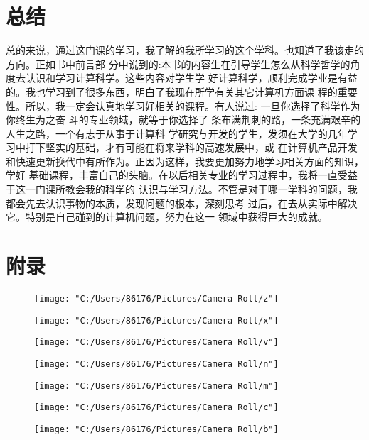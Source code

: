 \documentclass{article}
\begin{document}
\begin{itemize}
\end{itemize}


\section{总结}
总的来说，通过这门课的学习，我了解的我所学习的这个学科。也知道了我该走的方向。正如书中前言部 分中说到的:本书的内容生在引导学生怎么从科学哲学的角度去认识和学习计算科学。这些内容对学生学 好计算科学，顺利完成学业是有益的。我也学习到了很多东西，明白了我现在所学有关其它计算机方面课 程的重要性。所以，我一定会认真地学习好相关的课程。有人说过: 一旦你选择了科学作为你终生为之奋 斗的专业领域，就等于你选择了-条布满荆刺的路，一条充满艰辛的人生之路，一个有志于从事于计算科 学研究与开发的学生，发须在大学的几年学习中打下坚实的基础，才有可能在将来学科的高速发展中，或 在计算机产品开发和快速更新换代中有所作为。正因为这样，我要更加努力地学习相关方面的知识，学好 基础课程，丰富自己的头脑。在以后相关专业的学习过程中，我将一直受益于这一门课所教会我的科学的 认识与学习方法。不管是对于哪一学科的问题，我都会先去认识事物的本质，发现问题的根本，深刻思考 过后，在去从实际中解决它。特别是自己碰到的计算机问题，努力在这一 领域中获得巨大的成就。
\par


\section{附录}


\begin{figure}[tph]
	\centering
	\texttt{[image: "C:/Users/86176/Pictures/Camera Roll/z"]}
	\caption{}
	\label{fig:z}
	
\end{figure}
\begin{figure}[tph]
	\centering
	\texttt{[image: "C:/Users/86176/Pictures/Camera Roll/x"]}
	\caption{}
	\label{fig:x}
\end{figure}
\begin{figure}[tph]
	\centering
	\texttt{[image: "C:/Users/86176/Pictures/Camera Roll/v"]}
	\caption{}
	\label{fig:v}
\end{figure}
\begin{figure}[tph]
	\centering
	\texttt{[image: "C:/Users/86176/Pictures/Camera Roll/n"]}
	\caption{}
	\label{fig:n}
\end{figure}
\begin{figure}[tph]
	\centering
	\texttt{[image: "C:/Users/86176/Pictures/Camera Roll/m"]}
	\caption{}
	\label{fig:m}
\end{figure}
\begin{figure}[tph]
	\centering
	\texttt{[image: "C:/Users/86176/Pictures/Camera Roll/c"]}
	\caption{}
	\label{fig:c}
\end{figure}
\begin{figure}[tph]
	\centering
	\texttt{[image: "C:/Users/86176/Pictures/Camera Roll/b"]}
	\caption{}
	\label{fig:b}
\end{figure}
\end{document}
